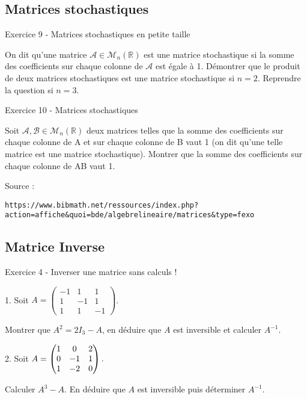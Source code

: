 \newpage
\subsection{Matrices stochastiques}

Exercice 9 - Matrices stochastiques en petite taille

On dit qu'une matrice $\mathcal{A}∈\mathcal{M}_n(\mathbb{R})$ est une matrice stochastique si la somme des coefficients sur chaque colonne de $\mathcal{A}$ est égale à 1. Démontrer que le produit de deux matrices stochastiques est une matrice stochastique si $n=2$. Reprendre la question si $n=3$.

\vspace{.323cm}
Exercice 10 - Matrices stochastiques

Soit $\mathcal{A},\mathcal{B}∈\mathcal{M}_n(\mathbb{R})$ deux matrices telles que la somme des coefficients sur chaque colonne de A et sur chaque colonne de B vaut 1 (on dit qu'une telle matrice est une matrice stochastique). Montrer que la somme des coefficients sur chaque colonne de AB vaut 1.

\vspace{.323cm}
{\scriptsize Source : 

\texttt{https://www.bibmath.net/ressources/index.php?action=affiche\&quoi=bde/algebrelineaire/matrices\&type=fexo}}

\subsection{Matrice Inverse}

Exercice 4 - Inverser une matrice sans calculs !
\vspace{.323cm}

\begin{minipage}[c]{.45\linewidth}
1. Soit $ A=\left(
\begin{array}{ccc}
-1&1&1\\1&-1&1\\1&1&-1
\end{array}\right)$.
\end{minipage}
\hfill
\begin{minipage}[c]{.45\linewidth}
Montrer que $A^2=2I_3-A$, en déduire que $A$ est inversible et calculer $A^{-1}$.
\end{minipage}

\vspace{.323cm}
\begin{minipage}[c]{.45\linewidth}
2. Soit $ A=\begin{pmatrix} 1 & 0 & 2 \cr
0 & -1 & 1 \cr
1 & -2 & 0 \cr \end{pmatrix} .$
\end{minipage}
\hfill
\begin{minipage}[c]{.45\linewidth}
Calculer $A^3-A .$ En déduire
que $ A $ est inversible puis déterminer $ A^{-1} .$ 
\end{minipage}

